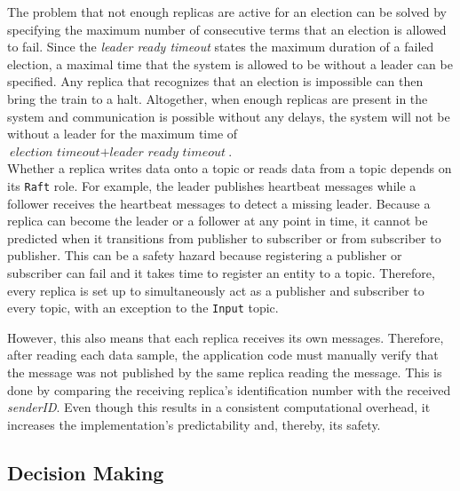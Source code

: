 The problem that not enough replicas are active for an election can be solved by specifying the maximum number of consecutive terms that an election is allowed to fail.
Since the \textit{leader ready timeout} states the maximum duration of a failed election, a maximal time that the system is allowed to be without a leader can be specified.
Any replica that recognizes that an election is impossible can then bring the train to a halt.
Altogether, when enough replicas are present in the system and communication is possible without any delays, the system will not be without a leader for the maximum time of $\textit{election timeout} + \textit{leader ready timeout}$.
\\

Whether a replica writes data onto a topic or reads data from a topic depends on its \texttt{Raft} role.
For example, the leader publishes heartbeat messages while a follower receives the heartbeat messages to detect a missing leader.
Because a replica can become the leader or a follower at any point in time, it cannot be predicted when it transitions from publisher to subscriber or from subscriber to publisher.
This can be a safety hazard because registering a publisher or subscriber can fail and it takes time to register an  entity to a topic.
Therefore, every replica is set up to simultaneously act as a publisher and subscriber to every topic, with an exception to the \texttt{Input} topic.

However, this also means that each replica receives its own messages.
Therefore, after reading each data sample, the application code must manually verify that the message was not published by the same replica reading the message.
This is done by comparing the receiving replica's identification number with the received \textit{senderID}.
Even though this results in a consistent computational overhead, it increases the implementation's predictability and, thereby, its safety.

\subsection{Decision Making}
\label{subsec:ImpInputProcessing}

